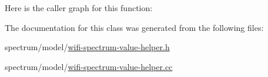 Here is the caller graph for this function\+:




The documentation for this class was generated from the following files\+:\begin{DoxyCompactItemize}
\item 
spectrum/model/\hyperlink{wifi-spectrum-value-helper_8h}{wifi-\/spectrum-\/value-\/helper.\+h}\item 
spectrum/model/\hyperlink{wifi-spectrum-value-helper_8cc}{wifi-\/spectrum-\/value-\/helper.\+cc}\end{DoxyCompactItemize}
